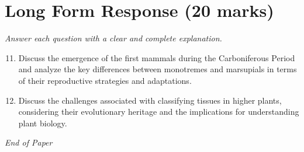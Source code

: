 \documentclass[12pt]{article}
\begin{document}
\section*{Long Form Response (20 marks)}
\textit{Answer each question with a clear and complete explanation.}
\begin{enumerate}[label=\arabic*.]
\setcounter{enumi}{10}
\item Discuss the emergence of the first mammals during the Carboniferous Period and analyze the key differences between monotremes and marsupials in terms of their reproductive strategies and adaptations.
\item Discuss the challenges associated with classifying tissues in higher plants, considering their evolutionary heritage and the implications for understanding plant biology.
\end{enumerate}

\vfill
\noindent\textit{End of Paper}
\end{document}

